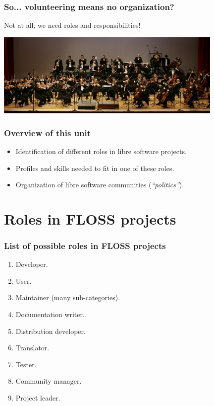 \documentclass{beamer}
\begin{document}
\begin{frame}
\frametitle{So... volunteering means no organization?}
\begin{LARGE}  Not at all, we need roles and responsibilities!  \end{LARGE}
\begin{center}
\includegraphics[width=11cm]{figs/Malta_Philharmonic_Orchestra}
\end{center}
\end{frame}

\begin{frame}
\frametitle{Overview of this unit}
\begin{itemize}
\item Identification of different roles in libre software projects.
\item Profiles and skills needed to fit in one of these roles.
\item Organization of libre software communities (\textit{``politics''}).
\end{itemize}
\end{frame}


\section{Roles in FLOSS projects}


\begin{frame}
\frametitle{List of possible roles in FLOSS projects}
\begin{enumerate}
 \item Developer.
 \item User.
 \item Maintainer (many sub-categories).
 \item Documentation writer.
 \item Distribution developer.
 \item Translator.
 \item Tester.
 \item Community manager.
 \item Project leader.
\end{enumerate}

\end{frame}
\end{document}
